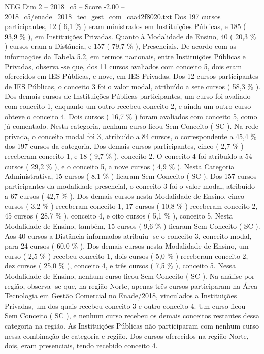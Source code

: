 \begin{textsample}{NEG Dim 2 – 2018\_c5 – Score -2.00 – 2018\_c5/enade\_2018\_tec\_gest\_com\_caa42f8020.txt}
Dos 197 cursos participantes, 12 ( 6,1 \% ) eram ministrados em Instituições Públicas, e 185 ( 93,9 \% ), em Instituições Privadas.
Quanto à Modalidade de Ensino, 40 ( 20,3 \% ) cursos eram a Distância, e 157 ( 79,7 \% ), Presenciais.
De acordo com as informações da Tabela 5.2, em termos nacionais, entre Instituições Públicas e Privadas, observa -se que, dos 11 cursos avaliados com conceito 5, dois eram oferecidos em IES Públicas, e nove, em IES Privadas.
Dos 12 cursos participantes de IES Públicas, o conceito 3 foi o valor modal, atribuído a sete cursos ( 58,3 \% ).
Dos demais cursos de Instituições Públicas participantes, um curso foi avaliado com conceito 1, enquanto um outro recebeu conceito 2, e ainda um outro curso obteve o conceito 4.
Dois cursos ( 16,7 \% ) foram avaliados com conceito 5, como já comentado.
Nesta categoria, nenhum curso ficou Sem Conceito ( SC ).
Na rede privada, o conceito modal foi 3, atribuído a 84 cursos, o correspondente a 45,4 \% dos 197 cursos da categoria.
Dos demais cursos participantes, cinco ( 2,7 \% ) receberam conceito 1, e 18 ( 9,7 \% ), conceito 2.
O conceito 4 foi atribuído a 54 cursos ( 29,2 \% ), e o conceito 5, a nove cursos ( 4,9 \% ).
Nesta Categoria Administrativa, 15 cursos ( 8,1 \% ) ficaram Sem Conceito ( SC ).
Dos 157 cursos participantes da modalidade presencial, o conceito 3 foi o valor modal, atribuído a 67 cursos ( 42,7 \% ).
Dos demais cursos nesta Modalidade de Ensino, cinco cursos ( 3,2 \% ) receberam conceito 1, 17 cursos ( 10,8 \% ) receberam conceito 2, 45 cursos ( 28,7 \% ), conceito 4, e oito cursos ( 5,1 \% ), conceito 5.
Nesta Modalidade de Ensino, também, 15 cursos ( 9,6 \% ) ficaram Sem Conceito ( SC ).
Aos 40 cursos a Distância informados atribuiu -se o conceito 3, conceito modal, para 24 cursos ( 60,0 \% ).
Dos demais cursos nesta Modalidade de Ensino, um curso ( 2,5 \% ) recebeu conceito 1, dois cursos ( 5,0 \% ) receberam conceito 2, dez cursos ( 25,0 \% ), conceito 4, e três cursos ( 7,5 \% ), conceito 5.
Nessa Modalidade de Ensino, nenhum curso ficou Sem Conceito ( SC ).
Na análise por região, observa -se que, na região Norte, apenas três cursos participaram na Área Tecnologia em Gestão Comercial no Enade/2018, vinculados a Instituições Privadas, um dos quais recebeu conceito 3 e outro conceito 4.
Um curso ficou Sem Conceito ( SC ), e nenhum curso recebeu os demais conceitos restantes dessa categoria na região.
As Instituições Públicas não participaram com nenhum curso nessa combinação de categoria e região.
Dos cursos oferecidos na região Norte, dois, eram presenciais, tendo recebido conceito 4.

\end{textsample}
